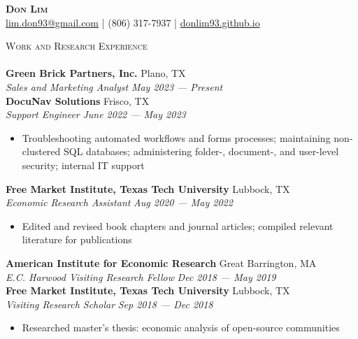 \documentclass[a4paper,11pt]{article}
\newcommand{\lineunder} {
    \vspace*{-8pt} \\
    \hspace*{-18pt} \hrulefill \\
}
\newcommand{\header} [1] {
    {\hspace*{-18pt}\vspace*{6pt} \textsc{\large{#1}}}
    \vspace*{-6pt} \lineunder
}
\begin{document}
\vspace*{-40pt}
\fontsize{10.5}{12}\selectfont

\vspace*{-10pt}
\begin{center}
    {\Huge\textbf\textsc{{{Don Lim}}}}\\
    \href{mailto:lim.don93@gmail.com}{\Letter\space lim.don93@gmail.com} | \Mobilefone\space (806) 317-7937 | \href{https://donlim93.github.io/}{\space donlim93.github.io} \\
\end{center}

\header{Work and Research Experience}
\textbf{Green Brick Partners, Inc.} \hfill \faMapMarker\space Plano, TX \\
\textit{Sales and Marketing Analyst} \hfill  \emph{May 2023 --- Present} \\

\textbf{DocuNav Solutions} \hfill \faMapMarker\space Frisco, TX \\
\textit{Support Engineer} \hfill  \emph{June 2022 --- May 2023} \\
\begin{itemize}
    \item Troubleshooting automated workflows and forms processes; maintaining non-clustered SQL databases; administering folder-, document-, and user-level security; internal IT support
\end{itemize}    

\textbf{Free Market Institute, Texas Tech University} \hfill \faMapMarker\space Lubbock, TX\\
\textit{Economic Research Assistant} \hfill  \emph{Aug 2020 --- May 2022} \\
\begin{itemize}
    \item Edited and revised book chapters and journal articles; compiled relevant literature for publications
\end{itemize}

\textbf{American Institute for Economic Research} \hfill \faMapMarker\space Great Barrington, MA\\
\textit{E.C. Harwood Visiting Research Fellow} \hfill  \emph{Dec 2018 --- May 2019}\\

\textbf{Free Market Institute, Texas Tech University} \hfill \faMapMarker\space Lubbock, TX\\
\textit{Visiting Research Scholar} \hfill  \emph{Sep 2018 --- Dec 2018}\\
\begin{itemize}
    \item Researched master's thesis: economic analysis of open-source communities
\end{itemize}
\end{document}
